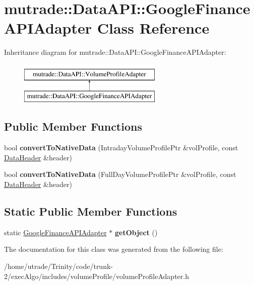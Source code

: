 \hypertarget{classmutrade_1_1_data_a_p_i_1_1_google_finance_a_p_i_adapter}{\section{mutrade\-:\-:Data\-A\-P\-I\-:\-:Google\-Finance\-A\-P\-I\-Adapter Class Reference}
\label{classmutrade_1_1_data_a_p_i_1_1_google_finance_a_p_i_adapter}
}
Inheritance diagram for mutrade\-:\-:Data\-A\-P\-I\-:\-:Google\-Finance\-A\-P\-I\-Adapter\-:\begin{figure}[H]
\begin{center}
\leavevmode
\includegraphics[height=2.000000cm]{classmutrade_1_1_data_a_p_i_1_1_google_finance_a_p_i_adapter}
\end{center}
\end{figure}
\subsection*{Public Member Functions}
\begin{DoxyCompactItemize}
\item 
\hypertarget{classmutrade_1_1_data_a_p_i_1_1_google_finance_a_p_i_adapter_a147a3507dff1cb17544a5b5b8aef3aa2}{bool {\bfseries convert\-To\-Native\-Data} (Intraday\-Volume\-Profile\-Ptr \&vol\-Profile, const \hyperlink{structmutrade_1_1_data_a_p_i_1_1_data_header}{Data\-Header} \&header)}\label{classmutrade_1_1_data_a_p_i_1_1_google_finance_a_p_i_adapter_a147a3507dff1cb17544a5b5b8aef3aa2}

\item 
\hypertarget{classmutrade_1_1_data_a_p_i_1_1_google_finance_a_p_i_adapter_a21f81bb9a6fd791e8b1f38eaeec65745}{bool {\bfseries convert\-To\-Native\-Data} (Full\-Day\-Volume\-Profile\-Ptr \&vol\-Profile, const \hyperlink{structmutrade_1_1_data_a_p_i_1_1_data_header}{Data\-Header} \&header)}\label{classmutrade_1_1_data_a_p_i_1_1_google_finance_a_p_i_adapter_a21f81bb9a6fd791e8b1f38eaeec65745}

\end{DoxyCompactItemize}
\subsection*{Static Public Member Functions}
\begin{DoxyCompactItemize}
\item 
\hypertarget{classmutrade_1_1_data_a_p_i_1_1_google_finance_a_p_i_adapter_a014037388c7045daf5c7c542eb749fb3}{static \hyperlink{classmutrade_1_1_data_a_p_i_1_1_google_finance_a_p_i_adapter}{Google\-Finance\-A\-P\-I\-Adapter} $\ast$ {\bfseries get\-Object} ()}\label{classmutrade_1_1_data_a_p_i_1_1_google_finance_a_p_i_adapter_a014037388c7045daf5c7c542eb749fb3}

\end{DoxyCompactItemize}


The documentation for this class was generated from the following file\-:\begin{DoxyCompactItemize}
\item 
/home/utrade/\-Trinity/code/trunk-\/2/exec\-Algo/includes/volume\-Profile/volume\-Profile\-Adapter.\-h\end{DoxyCompactItemize}
